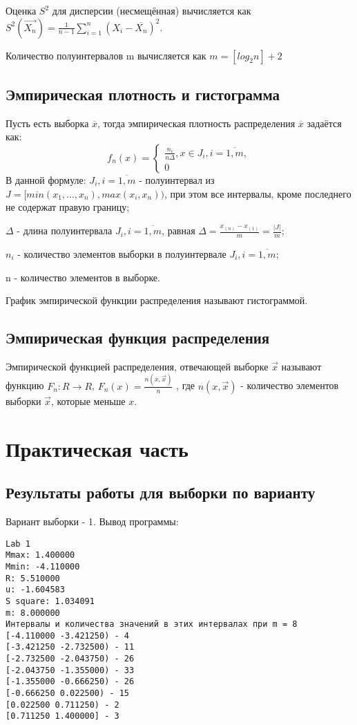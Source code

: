 Оценка $S^{2}$ для дисперсии (несмещённая) вычисляется как $S^{2}(\overrightarrow{X_{n}}) = \frac{1}{n - 1}\sum\limits_{i=1}^{n}(X_{i} - \overline{X_{n}})^{2}$.

Количество полуинтервалов m вычисляется как $m = [log_{2}n] + 2$\\
\section{Эмпирическая плотность и гистограмма}
Пусть есть выборка $\overline{x}$, тогда эмпирическая плотность распределения $\overline{x}$ задаётся как:
\begin{equation}
f_{n}(x) = 
\begin{cases}
\frac{n_{i}}{n \Delta}, x \in J_{i}, i = \overline{1, m},\\
0
\end{cases}
\end{equation}
В данной формуле:
$J_{i}, i = \overline{1, m}$ - полуинтервал из $J = [min(x_{1}, ..., x_{n}), max(x_{i}, x_{n}))$, при этом все интервалы, кроме последнего не содержат правую границу;

$\Delta$ - длина полуинтервала $J_{i}, i = \overline{1, m}$, равная $\Delta = \frac{x_{(n)} - x_{(1)}}{m} = \frac{|J|}{m}$;

$n_{i}$ - количество элементов выборки в полуинтервале $J_{i}, i = \overline{1, m}$;

n - количество элементов в выборке.

График эмпирической функции распределения называют гистограммой.

\section{Эмпирическая функция распределения}

Эмпирической функцией распределения, отвечающей выборке $\overrightarrow{x}$ называют функцию $F_{n}: R \rightarrow R$, $F_{n}(x) = \frac{n(x, \overrightarrow{x})}{n}$ , где $n(x, \overrightarrow{x})$ - количество элементов выборки $\overrightarrow{x}$, которые меньше $x$.

\chapter{Практическая часть}

\section{Результаты работы для выборки по варианту}
Вариант выборки - 1.
Вывод программы:
\begin{lstlisting}
Lab 1
Mmax: 1.400000
Mmin: -4.110000
R: 5.510000
u: -1.604583
S square: 1.034091
m: 8.000000
Интервалы и количества значений в этих интервалах при m = 8
[-4.110000 -3.421250) - 4
[-3.421250 -2.732500) - 11
[-2.732500 -2.043750) - 26
[-2.043750 -1.355000) - 33
[-1.355000 -0.666250) - 26
[-0.666250 0.022500) - 15
[0.022500 0.711250) - 2
[0.711250 1.400000] - 3
\end{lstlisting}

